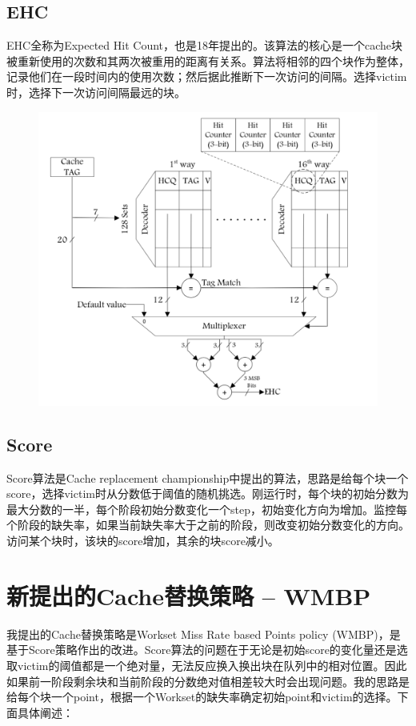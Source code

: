 \documentclass[utf8]{article}
\begin{document}
\subsection{EHC}
EHC全称为Expected Hit Count，也是18年提出的\cite{3}。该算法的核心是一个cache块被重新使用的次数和其两次被重用的距离有关系。算法将相邻的四个块作为整体，记录他们在一段时间内的使用次数；然后据此推断下一次访问的间隔。选择victim时，选择下一次访问间隔最远的块。
\begin{figure}[H]
	\centering
	\includegraphics[scale=0.5]{./photos/ehc.png}
	\label{Fig1}
\end{figure}

\subsection{Score}
Score算法是Cache replacement championship中提出的算法\cite{2}，思路是给每个块一个score，选择victim时从分数低于阈值的随机挑选。刚运行时，每个块的初始分数为最大分数的一半，每个阶段初始分数变化一个step，初始变化方向为增加。监控每个阶段的缺失率，如果当前缺失率大于之前的阶段，则改变初始分数变化的方向。访问某个块时，该块的score增加，其余的块score减小。

\section{新提出的Cache替换策略 -- WMBP}
我提出的Cache替换策略是Workset Miss Rate based Points policy (WMBP)，是基于Score策略作出的改进。Score算法的问题在于无论是初始score的变化量还是选取victim的阈值都是一个绝对量，无法反应换入换出块在队列中的相对位置。因此如果前一阶段剩余块和当前阶段的分数绝对值相差较大时会出现问题。我的思路是给每个块一个point，根据一个Workset的缺失率确定初始point和victim的选择。下面具体阐述：
\end{document}
